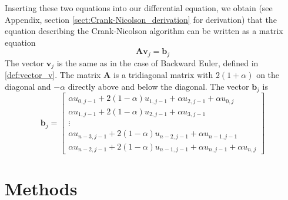 \documentclass[reprint, english,notitlepage,nofootinbib]{revtex4-1}  %
\newcommand{\vc}[1]{\mathbf{#1}}
\begin{document}
Inserting these two equations into our differential equation, we obtain (see Appendix, section \ref{sect:Crank-Nicolson_derivation} for derivation) that the equation describing the Crank-Nicolson algorithm can be written as a matrix equation
\begin{equation}
  \label{eq:Crank-Nicolson_matrix}
  \vc A \vc v_j = \vc b_j
\end{equation}
The vector $\vc v_j$ is the same as in the case of Backward Euler, defined in \eqref{def:vector_v}. The matrix $\vc A$ is a tridiagonal matrix with $2 (1 + \alpha)$ on the diagonal and $-\alpha$ directly above and below the diagonal. The vector $\vc b_j$ is
\begin{equation}
  \label{def:vector_b_CrankNicolson}
  \vc b_j =
  \begin{bmatrix}
    \alpha u_{0, j-1}  + 2 (1 - \alpha) u_{1,j-1} + \alpha u_{2, j-1} + \alpha u_{0, j} \\
    \alpha u_{1, j-1}  + 2 (1 - \alpha) u_{2,j-1} + \alpha u_{3, j-1} \\
      \vdots \\
    \alpha u_{n-3, j-1}  + 2 (1 - \alpha) u_{n-2,j-1} + \alpha u_{n-1, j-1} \\
    \alpha u_{n-2, j-1}  + 2 (1 - \alpha) u_{n-1,j-1} + \alpha u_{n, j-1} + \alpha u_{n, j}
  \end{bmatrix}
\end{equation}



\section{Methods}
\end{document}
